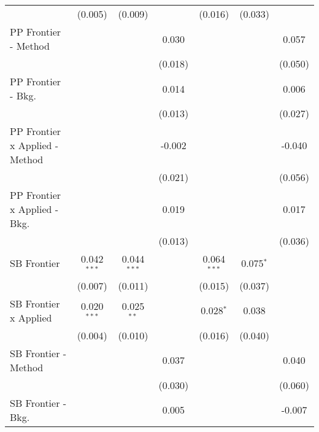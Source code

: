 \begin{tabular}{lcccccc}
                                  & (0.005)       & (0.009)       &               & (0.016)       & (0.033)       &   \\   
   PP Frontier - Method           &               &               & 0.030         &               &               & 0.057\\   
                                  &               &               & (0.018)       &               &               & (0.050)\\   
   PP Frontier - Bkg.             &               &               & 0.014         &               &               & 0.006\\   
                                  &               &               & (0.013)       &               &               & (0.027)\\   
   PP Frontier x Applied - Method &               &               & -0.002        &               &               & -0.040\\   
                                  &               &               & (0.021)       &               &               & (0.056)\\   
   PP Frontier x Applied - Bkg.   &               &               & 0.019         &               &               & 0.017\\   
                                  &               &               & (0.013)       &               &               & (0.036)\\   
   SB Frontier                    & 0.042$^{***}$ & 0.044$^{***}$ &               & 0.064$^{***}$ & 0.075$^{*}$   &   \\   
                                  & (0.007)       & (0.011)       &               & (0.015)       & (0.037)       &   \\   
   SB Frontier x Applied          & 0.020$^{***}$ & 0.025$^{**}$  &               & 0.028$^{*}$   & 0.038         &   \\   
                                  & (0.004)       & (0.010)       &               & (0.016)       & (0.040)       &   \\   
   SB Frontier - Method           &               &               & 0.037         &               &               & 0.040\\   
                                  &               &               & (0.030)       &               &               & (0.060)\\   
   SB Frontier - Bkg.             &               &               & 0.005         &               &               & -0.007\\   

\end{tabular}
